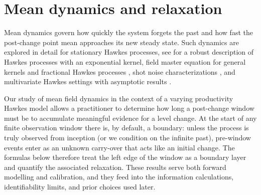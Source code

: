 \documentclass{article}
\theoremstyle{plain}
\theoremstyle{definition}
\newcommand{\1}{\mathbf{1}}
\begin{document}
    \section{Mean dynamics and relaxation}
    \label{sec:mean-dynamics}
    
    Mean dynamics govern how quickly the system forgets the past and how fast the post-change point mean approaches its new steady state. Such dynamics are explored in detail for stationary Hawkes processes, see \cite{bremaud2002rate,gao2018limit} for a robust description of Hawkes processes with an exponential kernel, field master equation for general kernels \cite{kanazawa2020field} and fractional Hawkes processes \cite{hainaut2020fractional}, shot noise characterizations \cite{dassios2011dynamic}, and multivariate Hawkes settings with asymptotic results \cite{chevallier2017mean,clinet2017statistical,duarte2019stability}. 
    
    Our study of mean field dynamics in the context of a varying productivity Hawkes model allows a practitioner to determine how long a post-change window must be to accumulate meaningful evidence for a level change. At the start of any finite observation window there is, by default, a boundary: unless the process is truly observed from inception (or we condition on the infinite past), pre-window events enter as an unknown carry-over that acts like an initial change. The formulas below therefore treat the left edge of the window as a boundary layer and quantify the associated relaxation. These results serve both forward modelling and calibration, and they feed into the information calculations, identifiability limits, and prior choices used later.
    
\end{document}
